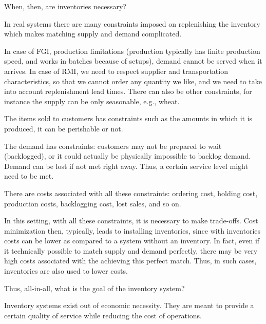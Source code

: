 \begin{question}
When, then, are inventories necessary?
\end{question}

  \begin{solution}
    In real systems there are many constraints imposed on replenishing
    the inventory which makes matching supply and demand
    complicated.

    In case of FGI, production limitations (production typically has
    finite production speed, and works in batches because of setups),
    demand cannot be served when it arrives.  In case of RMI, we need
    to respect supplier and transportation characteristics, so that we
    cannot order any quantity we like, and we need to take into
    account replenishment lead times. There can also be other
    constraints, for instance the supply can be only seasonable, e.g.,
    wheat.

    The items sold to customers has constraints such as the amounts in
    which it is produced, it can be perishable or not.

    The demand has constraints: customers may not be prepared to wait
    (backlogged), or it could actually be physically impossible to backlog
    demand. Demand can be lost if not met right away. Thus, a certain
    service level might need to be met.

    There are costs associated with all these constraints: ordering
    cost, holding cost, production costs, backlogging cost, lost
    sales, and so on.

    In this setting, with all these constraints, it is necessary to
    make trade-offs. Cost minimization then, typically, leads to
    installing inventories, since with inventories costs can be lower
    as compared to a system without an inventory. In fact, even if it technically possible to match supply and
    demand perfectly, there may be very high costs associated with the
    achieving this perfect match. Thus, in such cases, inventories are
    also used  to lower costs.
  \end{solution}

\begin{question}
Thus, all-in-all, what is the goal of the inventory system?
\end{question}

  \begin{solution}
    Inventory systems exist out of economic necessity. They are meant
    to provide a certain quality of service while reducing the cost of operations. 
  \end{solution}
  

